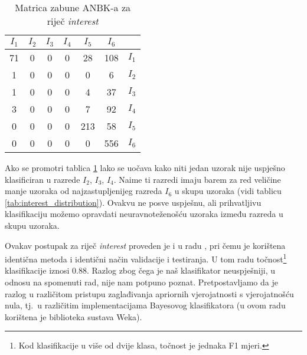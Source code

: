 \documentclass[10pt, a4paper]{article}
\begin{document}
\begin{table}[!hbtp]
\caption{Matrica zabune ANBK-a za riječ \emph{interest}}
\label{tab:interest_confusion_bayes}
\begin{center}
\begin{tabular}{|cccccc|c|}
\hline
$I_1$ & $I_2$ & $I_3$ & $I_4$ & $I_5$ & $I_6$ &  \\
\hline
  71  & 0 &  0 &  0 & 28  & 108 &   $I_1$  \\
   1  & 0 &  0 &  0 &  0  &  6  &   $I_2$  \\
   1  & 0 &  0 &  0 &  4  & 37  &   $I_3$  \\
   3  & 0 &  0 &  0 &  7  & 92  &   $I_4$  \\
   0  & 0 &  0 &  0 & 213 & 58  &   $I_5$  \\
   0  & 0 &  0 &  0 &  0  & 556 &   $I_6$  \\
\hline
\end{tabular}
\end{center}
\end{table}

Ako se promotri tablica \ref{tab:interest_confusion_bayes} lako se uočava
kako niti jedan uzorak nije uspješno klasificiran u razrede $I_2$, $I_3$, $I_4$.
Naime ti razredi imaju barem za red veličine manje uzoraka od najzastupljenijeg razreda $I_6$
u skupu uzoraka (vidi tablicu \ref{tab:interest_distribution}). Ovakvu ne posve
uspješnu, ali prihvatljivu klasifikaciju možemo opravdati neuravnoteženošću uzoraka
između razreda u skupu uzoraka.

Ovakav postupak za riječ \emph{interest} proveden je i u radu \citep{pedersen}, pri
čemu je korištena identična metoda i identični način validacije i testiranja. 
U tom radu točnost\footnote{Kod klasifikacije u više od dvije klasa, točnost je jednaka F1 mjeri.} klasifikacije iznosi $0.88$. 
Razlog zbog čega je naš klasifikator neuspješniji, u odnosu na spomenuti rad, nije nam 
potpuno poznat. Pretpostavljamo da je razlog u različitom pristupu zaglađivanja
apriornih vjerojatnosti s vjerojatnošću nula, tj.~u različitim
implementacijama Bayesovog klasifikatora (u ovom radu korištena
je biblioteka sustava Weka). 
\end{document}
